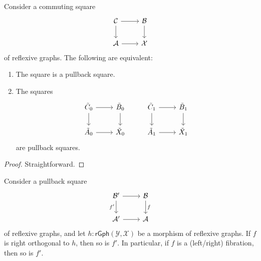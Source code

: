 \begin{prp}
Consider a commuting square
\begin{equation*}
\begin{tikzcd}
\mathcal{C} \arrow[r] \arrow[d] & \mathcal{B} \arrow[d] \\
\mathcal{A} \arrow[r] & \mathcal{X}
\end{tikzcd}
\end{equation*}
of reflexive graphs. The following are equivalent:
\begin{enumerate}
\item The square is a pullback square.
\item The squares
\begin{equation*}
\begin{tikzcd}
\tilde{C}_0 \arrow[r] \arrow[d] & \tilde{B}_0 \arrow[d] & \tilde{C}_1 \arrow[r] \arrow[d] & \tilde{B}_1 \arrow[d] \\
\tilde{A}_0 \arrow[r] & \tilde{X}_0 & \tilde{A}_1 \arrow[r] & \tilde{X}_1
\end{tikzcd}
\end{equation*}
are pullback squares.
\end{enumerate}
\end{prp}

\begin{proof}
Straightforward.
\end{proof}

\begin{prp}
Consider a pullback square
\begin{equation*}
\begin{tikzcd}
\mathcal{B}' \arrow[r] \arrow[d,swap,"{f'}"] & \mathcal{B} \arrow[d,"f"] \\
\mathcal{A}' \arrow[r] & \mathcal{A}
\end{tikzcd}
\end{equation*}
of reflexive graphs, and let $h:\mathsf{rGph}(\mathcal{Y},\mathcal{X})$ be a morphism of reflexive graphs. If $f$ is right orthogonal to $h$, then so is $f'$. In particular, if $f$ is a (left/right) fibration, then so is $f'$. 
\end{prp}

